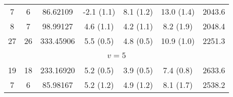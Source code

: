 \begin{table*}[htp]
\begin{tabular}{ccccccc}
 7 & 6 & 86.62109 & -2.1 (1.1) & 8.1 (1.2) & 13.0 (1.4) & 2043.6 \\
 8 & 7 & 98.99127 & 4.6 (1.1) & 4.2 (1.1) & 8.2 (1.9) & 2048.4 \\
 27 & 26 & 333.45906 & 5.5 (0.5) & 4.8 (0.5) & 10.9 (1.0) & 2251.3 \\
&\vspace{-0.75em}\\
\multicolumn{7}{c}{$v = 5$} \\
\vspace{-0.75em}\\
 19 & 18 & 233.16920 & 5.2 (0.5) & 3.9 (0.5) & 7.4 (0.8) & 2633.6 \\
 7 & 6 & 85.98167 & 5.2 (1.2) & 4.9 (1.2) & 8.1 (1.7) & 2538.2 \\
\hline
\end{tabular}

\par 
\end{table*}
